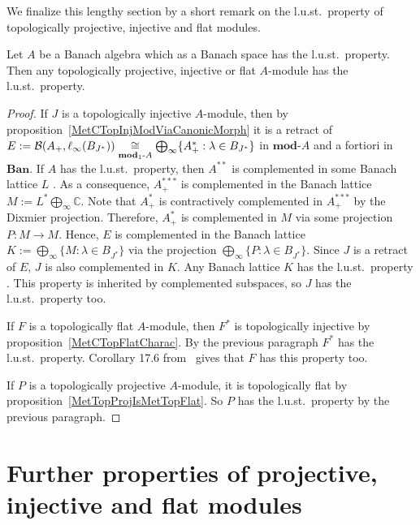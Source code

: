 We finalize this lengthy section by a short remark on the l.u.st.\ property of
topologically projective, injective and flat modules. 

\begin{proposition} Let $A$ be a Banach algebra which as a Banach space has the
l.u.st.\ property. Then any topologically projective, injective or flat
$A$-module has the l.u.st.\ property.
\end{proposition}
\begin{proof} 

If $J$ is a topologically injective $A$-module, then by
proposition~\ref{MetCTopInjModViaCanonicMorph} it is a retract of
$E:=\mathcal{B}(A_+,\ell_\infty(B_{J^*}))
\mathrel{\mathop{\cong}\limits_{\mathbf{mod}_1\text{-}A}}
\bigoplus_\infty \{ A_+^*:\lambda\in B_{J^*} \}$ 
in $\mathbf{mod}\text{-}A$ and a fortiori in $\mathbf{Ban}$. If $A$ has 
the l.u.st.\ property, then $A^{**}$ is complemented
in some Banach lattice $L$ \cite[theorem 17.5]{DiestAbsSumOps}. As a
consequence, $A_+^{***}$ is complemented in the Banach lattice
$M:=L^*\bigoplus_\infty\mathbb{C}$. Note that $A_+^*$ is contractively
complemented in $A_+^{***}$ by the Dixmier projection. Therefore, $A_+^*$ is 
complemented in $M$ via some projection $P:M\to M$. Hence, $E$ is
complemented in the Banach lattice $K:=\bigoplus_\infty \{M:\lambda\in B_{J^*} \}$
via the projection $\bigoplus_\infty \{P:\lambda\in B_{J^*} \}$. Since $J$ is a 
retract of $E$, $J$ is also complemented in $K$. Any Banach 
lattice $K$ has the l.u.st.\ property \cite[theorem 17.1]{DiestAbsSumOps}. 
This property is inherited by complemented subspaces, so $J$ has the l.u.st.\ 
property too.

If $F$ is a topologically flat $A$-module, then $F^*$ is topologically injective
by proposition~\ref{MetCTopFlatCharac}. By the previous paragraph $F^*$ has the
l.u.st.\ property. Corollary 17.6 from~\cite{DiestAbsSumOps} gives that $F$ has
this property too.

If $P$ is a topologically projective $A$-module, it is topologically flat by
proposition~\ref{MetTopProjIsMetTopFlat}. So $P$ has the l.u.st.\ property by the
previous paragraph.
\end{proof}


\section{
    Further properties of projective, injective and flat modules}\label{
SectionFurtherPropertiesOfProjectiveInjectiveAndFlatModules}


